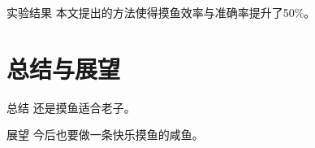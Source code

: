 \documentclass[10pt,aspectratio=169,mathserif]{ctexbeamer}
\begin{document}
\begin{frame}{实验结果}
本文提出的方法使得摸鱼效率与准确率提升了50\%。
\end{frame}

\section{总结与展望}
\label{sec:conclusion}
\begin{comment}
最后一定要有总结，突出个人工作和结果
展望和工作的不足之处不宜多，淡化处理。
致谢可以写，但要简练，并且不要照着读，一句话即可，如：“最后，感谢所有关心和帮助过我的每一个人，感谢各位专家和评委老师”。
\end{comment}
\begin{frame}{总结}
还是摸鱼适合老子。
\end{frame}

\begin{frame}{展望}
今后也要做一条快乐摸鱼的咸鱼。
\end{frame}
\end{document}
